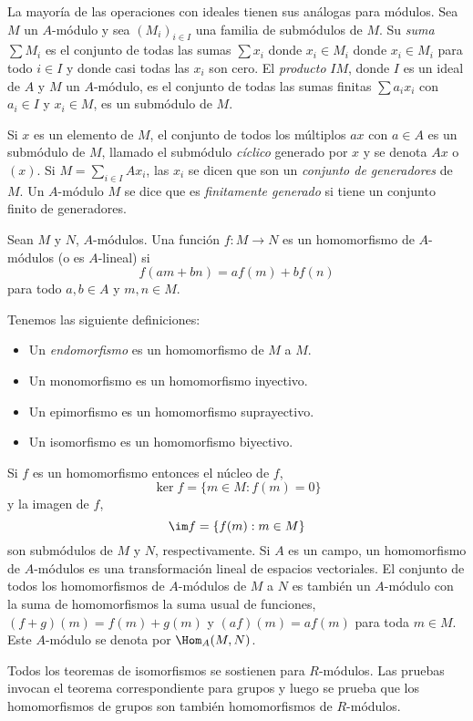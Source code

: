 La mayoría de las operaciones con ideales tienen sus análogas para módulos. Sea $M$ un $A$-módulo y sea $(M_i)_{i\in I}$ una familia de submódulos de $M$. Su \emph{suma} $\sum M_i$ es el conjunto de todas las sumas $\sum x_i$ donde $x_i \in M_i$ donde $x_i \in M_i$ para todo $i \in I$ y donde casi todas las $x_i$ son cero. El \emph{producto} $IM$, donde $I$ es un ideal de $A$ y $M$ un $A$-módulo, es el conjunto de todas las sumas finitas $\sum a_i x_i$ con $a_i \in I$ y $x_i \in M$, es un submódulo de $M$.

Si $x$ es un elemento de $M$, el conjunto de todos los múltiplos $ax$ con $a \in A$ es un submódulo de $M$, llamado el submódulo \emph{cíclico} generado por $x$ y se denota $Ax$ o $(x)$. Si $M = \sum_{i \in I} A x_i$, las $x_i$ se dicen que son un \emph{conjunto de generadores} de $M$. Un $A$-módulo $M$ se dice que es \emph{finitamente generado} si tiene un conjunto finito de generadores.

\begin{definition}
  Sean $M$ y $N$, $A$-módulos. Una función $f\colon M \to N $ es un homomorfismo de $A$-módulos (o es $A$-lineal) si 
    \[
      f(am+bn) = af(m) + bf(n)
    \]
  para todo $a,b \in A$ y $m,n \in M$.
\end{definition}

Tenemos las siguiente definiciones: 
\begin{itemize}
  \item Un \emph{endomorfismo} es un homomorfismo de $M$ a $M$.
  \item Un monomorfismo es un homomorfismo inyectivo.
  \item Un epimorfismo es un homomorfismo suprayectivo.
  \item Un isomorfismo es un homomorfismo biyectivo.
\end{itemize}

Si $f$ es un homomorfismo entonces el núcleo de $f$,
  \[
    \ker f = \{m \in M : f(m) = 0\}
  \]
y la imagen de $f$,
  \[
    \im f = \{f(m) : m \in M\}
  \]
son submódulos de $M$ y $N$, respectivamente. Si $A$ es un campo, un homomorfismo de $A$-módulos es una transformación lineal de espacios vectoriales. El conjunto de todos los homomorfismos de $A$-módulos de $M$ a $N$ es también un $A$-módulo con la suma de homomorfismos la suma usual de funciones, $(f+g)(m) = f(m) + g(m)$ y $(af)(m) = af(m)$ para toda $m \in M$. Este $A$-módulo se denota por $\Hom_A(M,N)$.

Todos los teoremas de isomorfismos se sostienen para $R$-módulos. Las pruebas invocan el teorema correspondiente para grupos y luego se prueba que los homomorfismos de grupos son también homomorfismos de $R$-módulos.

